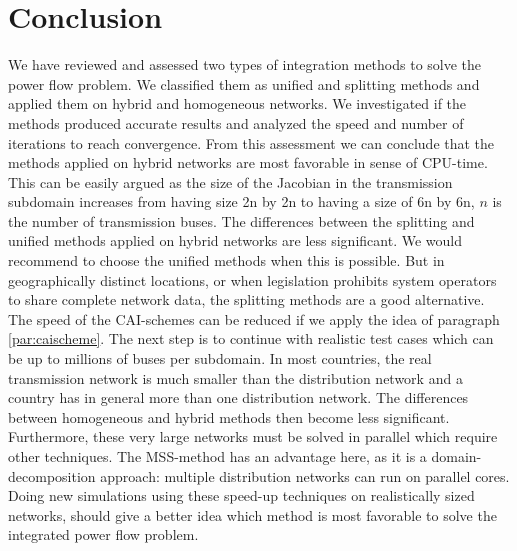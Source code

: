 \documentclass[10pt,journal]{article}
\begin{document}
\section{Conclusion}
We have reviewed and assessed two types of integration methods to solve the power flow problem. We classified them as unified and splitting methods and applied them on hybrid and homogeneous networks. We investigated if the methods produced accurate results and analyzed the speed and number of iterations to reach convergence. \newline
From this assessment we can conclude that the methods applied on hybrid networks are most favorable in sense of CPU-time. This can be easily argued as the size of the Jacobian in the transmission subdomain increases from having size 2n by 2n to having a size of 6n by 6n, $n$ is the number of transmission buses. The differences between the splitting and unified methods applied on hybrid networks are less significant. We would recommend to choose the unified methods when this is possible. But in geographically distinct locations, or when legislation prohibits system operators to share complete network data, the splitting methods are a good alternative. The speed of the CAI-schemes can be reduced if we apply the idea of paragraph \ref{par:caischeme}. \newline\newline
The next step is to continue with realistic test cases which can be up to millions of buses per subdomain. In most countries, the real transmission network is much smaller than the distribution network and a country has in general more than one distribution network. The differences between homogeneous and hybrid methods then become less significant. Furthermore, these very large networks must be solved in parallel which require other techniques. The MSS-method has an advantage here, as it is a domain-decomposition approach: multiple distribution networks can run on parallel cores. Doing new simulations using these speed-up techniques on realistically sized networks, should give a better idea which method is most favorable to solve the integrated power flow problem. 

\newpage

 
\end{document}
